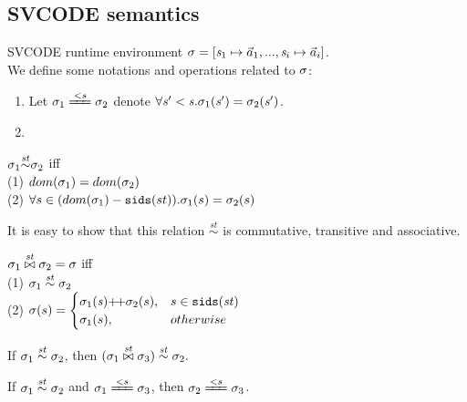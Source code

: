 \subsection{SVCODE semantics}

SVCODE runtime environment $\sgm = [\s_1 \|-> {\a_1},...,\s_i \|-> {\a_i}]$.\\
We define some notations and operations related to $\sigma$:
\begin{enumerate}[(1)]
\item Let $\sgm_1 \ConEq{\s} \sgm_2$ denote $\forall \mathit{s}' < \mathit{s}. \sigma_1(\mathit{s}') = \sigma_2(\mathit{s}')$. \\

\item {}
\PT{\Axiom{\sgm(\s) = \a}} 

\end{enumerate}

\begin{defi}
	\label{sgm-sim}
	
	$\sigma_1 {\stackrel{\mathit{st}}{\sim}} \sigma_2 $
	 iff \\
	\indent (1) $dom(\sigma_1) = dom(\sigma_2)$ \\
	\indent (2) $\forall s \in (dom(\sigma_1) - \mathtt{sids}(st)).\sigma_1(s)= \sigma_2(s)$ \\
\end{defi}

It is easy to show that this relation $\overset{st}{\sim}$ is commutative, transitive and associative.


\begin{defi}
	\label{sgm-join}
	$\sigma_1 \stackrel{\mathit{st}}{\bowtie} \sigma_2 = \sigma$ iff \\
	(1) $\sigma_1 \stackrel{\mathit{st}}{\sim} \sigma_2$  \\
	(2) $\sgm(s) =
		\begin{cases}
		\sgm_1(\s) {\++} \sgm_2(s), & s \in \sids{\st} \\
		\sgm_1(s),&  otherwise
		\end{cases} $
\end{defi}

\begin{lem} \label{lem-join1}
	If $\sigma_1 \stackrel{\mathit{st}}{\sim} \sigma_2$, 
	then $(\sigma_1 \stackrel{\mathit{st}}{\bowtie} \sigma_3) \stackrel{\mathit{st}}{\sim} \sigma_2.$
\end{lem}

\begin{lem}[??! wrong] \label{lem-join2}
	If $\sigma_1 \stackrel{\mathit{st}}{\sim} \sigma_2$ and $\sgm_1 \ConEq{s} \sgm_3$, 
	then $\sgm_2 \ConEq{s} \sgm_3$. 
\end{lem}

